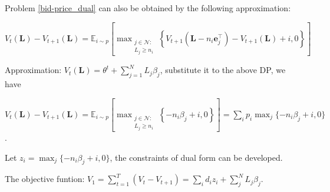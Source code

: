 Problem \ref{bid-price_dual} can also be obtained by the following approximation:

$V_{t}(\mathbf{L}) - V_{t+1}(\mathbf{L}) = \mathbb{E}_{i \sim p}\left[\max_{\substack{j \in \mathcal{N}: \\ L_j \geqslant {n}_{i}}}\left\{V_{t+1}\left(\mathbf{L}- n_{i}\mathbf{e}_j^{\intercal} \right)- V_{t+1}(\mathbf{L}) + i, 0 \right\}\right]$

Approximation: $V_{t}(\mathbf{L}) = \theta^{t} + \sum_{j=1}^{N} L_j \beta_j$, substitute it to the above DP, we have 

$V_{t}(\mathbf{L}) - V_{t+1}(\mathbf{L}) = \mathbb{E}_{i \sim p}\left[\max_{\substack{j \in \mathcal{N}: \\ L_j \geqslant {n}_{i}}}\left\{-n_i \beta_j + i, 0 \right\}\right] = \sum_i p_i \max_{j} \{-n_i \beta_j + i, 0\}$.

Let $z_i = \max_{j} \{-n_i \beta_j + i, 0\}$, the constraints of dual form can be developed.

The objective funtion: $V_{1} = \sum_{t=1}^{T} (V_{t} - V_{t+1}) = \sum_{i} d_{i} z_{i} + \sum_{j}^{N} L_{j} \beta_j$.

\newpage
